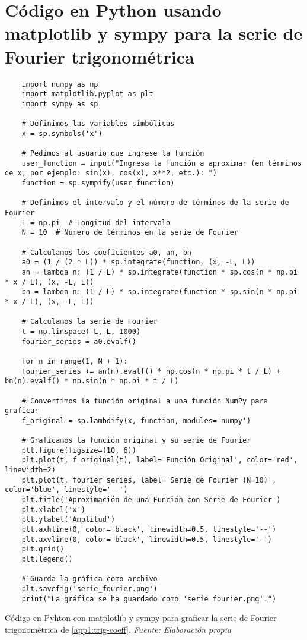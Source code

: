 \section{Código en Python usando matplotlib y sympy para la serie de Fourier trigonométrica}\label{app2:trig-code-python-matplotlib-sympy}
\begin{longlisting}
	\begin{verbatim}
	import numpy as np
	import matplotlib.pyplot as plt
	import sympy as sp
	
	# Definimos las variables simbólicas
	x = sp.symbols('x')
	
	# Pedimos al usuario que ingrese la función
	user_function = input("Ingresa la función a aproximar (en términos de x, por ejemplo: sin(x), cos(x), x**2, etc.): ")
	function = sp.sympify(user_function)
	
	# Definimos el intervalo y el número de términos de la serie de Fourier
	L = np.pi  # Longitud del intervalo
	N = 10  # Número de términos en la serie de Fourier
	
	# Calculamos los coeficientes a0, an, bn
	a0 = (1 / (2 * L)) * sp.integrate(function, (x, -L, L))
	an = lambda n: (1 / L) * sp.integrate(function * sp.cos(n * np.pi * x / L), (x, -L, L))
	bn = lambda n: (1 / L) * sp.integrate(function * sp.sin(n * np.pi * x / L), (x, -L, L))
	
	# Calculamos la serie de Fourier
	t = np.linspace(-L, L, 1000)
	fourier_series = a0.evalf()
	
	for n in range(1, N + 1):
	fourier_series += an(n).evalf() * np.cos(n * np.pi * t / L) + bn(n).evalf() * np.sin(n * np.pi * t / L)
	
	# Convertimos la función original a una función NumPy para graficar
	f_original = sp.lambdify(x, function, modules='numpy')
	
	# Graficamos la función original y su serie de Fourier
	plt.figure(figsize=(10, 6))
	plt.plot(t, f_original(t), label='Función Original', color='red', linewidth=2)
	plt.plot(t, fourier_series, label='Serie de Fourier (N=10)', color='blue', linestyle='--')
	plt.title('Aproximación de una Función con Serie de Fourier')
	plt.xlabel('x')
	plt.ylabel('Amplitud')
	plt.axhline(0, color='black', linewidth=0.5, linestyle='--')
	plt.axvline(0, color='black', linewidth=0.5, linestyle='-')
	plt.grid()
	plt.legend()
	
	# Guarda la gráfica como archivo
	plt.savefig('serie_fourier.png')
	print("La gráfica se ha guardado como 'serie_fourier.png'.")
	\end{verbatim}
	\caption[Código en Pyhton con matplotlib y sympy para graficar la serie de Fourier trigonométrica de \ref{app1:trig-coeff}.] {Código en Pyhton con matplotlib y sympy para graficar la serie de Fourier trigonométrica de \ref{app1:trig-coeff}. \textit{Fuente: Elaboración propia}} 
\end{longlisting}


